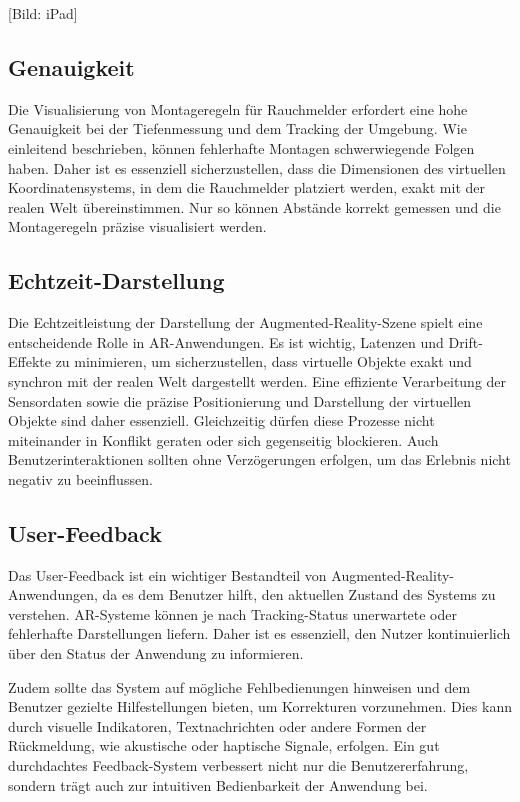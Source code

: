 [Bild: iPad]

\subsection{Genauigkeit}

Die Visualisierung von Montageregeln für Rauchmelder erfordert eine hohe Genauigkeit bei der Tiefenmessung und dem Tracking der Umgebung. Wie einleitend beschrieben, können fehlerhafte Montagen schwerwiegende Folgen haben. Daher ist es essenziell sicherzustellen, dass die Dimensionen des virtuellen Koordinatensystems, in dem die Rauchmelder platziert werden, exakt mit der realen Welt übereinstimmen. Nur so können Abstände korrekt gemessen und die Montageregeln präzise visualisiert werden.

\subsection{Echtzeit-Darstellung}

Die Echtzeitleistung der Darstellung der Augmented-Reality-Szene spielt eine entscheidende Rolle in AR-Anwendungen. Es ist wichtig, Latenzen und Drift-Effekte zu minimieren, um sicherzustellen, dass virtuelle Objekte exakt und synchron mit der realen Welt dargestellt werden. Eine effiziente Verarbeitung der Sensordaten sowie die präzise Positionierung und Darstellung der virtuellen Objekte sind daher essenziell. Gleichzeitig dürfen diese Prozesse nicht miteinander in Konflikt geraten oder sich gegenseitig blockieren. Auch Benutzerinteraktionen sollten ohne Verzögerungen erfolgen, um das Erlebnis nicht negativ zu beeinflussen.

\subsection{User-Feedback}

Das User-Feedback ist ein wichtiger Bestandteil von Augmented-Reality-Anwendungen, da es dem Benutzer hilft, den aktuellen Zustand des Systems zu verstehen. AR-Systeme können je nach Tracking-Status unerwartete oder fehlerhafte Darstellungen liefern. Daher ist es essenziell, den Nutzer kontinuierlich über den Status der Anwendung zu informieren.

Zudem sollte das System auf mögliche Fehlbedienungen hinweisen und dem Benutzer gezielte Hilfestellungen bieten, um Korrekturen vorzunehmen. Dies kann durch visuelle Indikatoren, Textnachrichten oder andere Formen der Rückmeldung, wie akustische oder haptische Signale, erfolgen. Ein gut durchdachtes Feedback-System verbessert nicht nur die Benutzererfahrung, sondern trägt auch zur intuitiven Bedienbarkeit der Anwendung bei.

